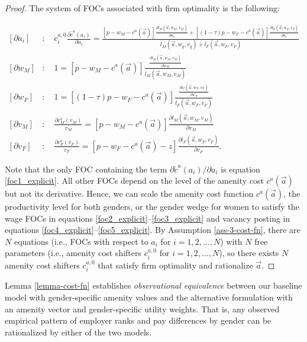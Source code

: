 \begin{proof}
    The system of FOCs associated with firm optimality is the following:
    \begin{small}
        \begin{align}
            \left[\partial a_{i}\right] & :\quad c_{i}^{a,0}\frac{\partial\tilde{c}^{a}\left(a_{i}\right)}{\partial a_{i}}
             =\frac{\left[p-w_{M}-c^{a}\left(\vec{a}\right)\right]\frac{\partial l_{M}\left(\vec{a},w_{M},v_{M}\right)}{\partial a_{i}}+\left[(1-\tau) p - w_{F}-c^{a}\left(\vec{a}\right)\right]\frac{\partial l_{F}\left(\vec{a},w_{F},v_{F}\right)}{\partial a_{i}}}{l_{M}\left(\vec{a},w_{g},v_{g}\right)+l_{F}\left(\vec{a},w_{F},v_{F}\right)}\label{foc1_explicit}\\
            \left[\partial w_{M}\right] & :\quad1=\left[p-w_{M}-c^{a}\left(\vec{a}\right)\right]\frac{\frac{\partial l_{M}\left(\vec{a},w_{M},v_{M}\right)}{\partial w_{M}}}{l_{M}\left(\vec{a},w_{M},v_{M}\right)}\label{foc2_explicit}\\
            \left[\partial w_{F}\right] & :\quad1=\left[(1-\tau) p-w_{F}-c^{a}\left(\vec{a}\right)\right]\frac{\frac{\partial l_{F}\left(\vec{a},w_{F},v_{F}\right)}{\partial w_{F}}}{l_{F}\left(\vec{a},w_{F},v_{F}\right)}\label{foc3_explicit}\\
            \left[\partial v_{M}\right] & :\quad\frac{\partial c_{M}^{v}(v_{M})}{v_{M}}=\left[p-w_{M}-c^{a}\left(\vec{a}\right)\right]\frac{\partial l_{M}\left(\vec{a},w_{M},v_{M}\right)}{\partial v_{M}}\label{foc4_explicit}\\
            \left[\partial v_{F}\right] & :\quad\frac{\partial c_{F}^{v}(v_{F})}{v_{F}}=\left[p-w_{F}-c^{a}\left(\vec{a}\right)-z\right]\frac{\partial l_{F}\left(\vec{a},w_{F},v_{F}\right)}{\partial v_{F}}\label{foc5_explicit}.
        \end{align}
    \end{small}
    Note that the only FOC containing the term $\partial\tilde{c}^{a}\left(a_{i}\right)/\partial a_{i}$ is equation \eqref{foc1_explicit}. All other FOCs depend on the level of the amenity cost $c^{a}\left(\vec{a}\right)$ but not its derivative. Hence, we can scale the amenity cost function $c^{a}\left(\vec{a}\right)$, the productivity level for both genders, or the gender wedge for women to satisfy the wage FOCs in equations \eqref{foc2_explicit}--\eqref{foc3_explicit} and vacancy posting in equations \eqref{foc4_explicit}--\eqref{foc5_explicit}. By Assumption \ref{ass-3-cost-fn}, there are $N$ equations (i.e.,
    FOCs with respect to $a_{i}$ for $i=1,2,\ldots,N$) with $N$ free parameters (i.e., amenity cost shifters $c_{i}^{a,0}$ for $i=1,2,\ldots,N$), so there exists $N$ amenity cost shifters $c_{i}^{a,0}$ that satisfy firm optimality and rationalize $\vec{a}$.
\end{proof}
%
Lemma \ref{lemma-cost-fn} establishes \emph{observational equivalence} between our baseline model with gender-specific amenity values and
the alternative formulation with an amenity vector and gender-specific utility weights. That is, any observed empirical pattern of employer ranks and pay differences by gender can be rationalized by either of the two models.

